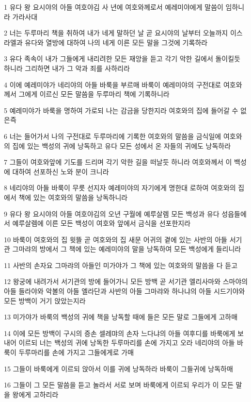 \par 1 유다 왕 요시야의 아들 여호야김 사 년에 여호와께로서 예레미야에게 말씀이 임하니라 가라사대
\par 2 너는 두루마리 책을 취하여 내가 네게 말하던 날 곧 요시야의 날부터 오늘까지 이스라엘과 유다와 열방에 대하여 나의 네게 이른 모든 말을 그것에 기록하라
\par 3 유다 족속이 내가 그들에게 내리려한 모든 재앙을 듣고 각기 악한 길에서 돌이킬듯 하니라 그리하면 내가 그 악과 죄를 사하리라
\par 4 이에 예레미야가 네리야의 아들 바룩을 부르매 바룩이 예레미야의 구전대로 여호와께서 그에게 이르신 모든 말씀을 두루마리 책에 기록하니라
\par 5 예레미야가 바룩을 명하여 가로되 나는 감금을 당한지라 여호와의 집에 들어갈 수 없은즉
\par 6 너는 들어가서 나의 구전대로 두루마리에 기록한 여호와의 말씀을 금식일에 여호와의 집에 있는 백성의 귀에 낭독하고 유다 모든 성에서 온 자들의 귀에도 낭독하라
\par 7 그들이 여호와앞에 기도를 드리며 각기 악한 길을 떠날듯 하니라 여호와께서 이 백성에 대하여 선포하신 노와 분이 크니라
\par 8 네리야의 아들 바룩이 무릇 선지자 예레미야의 자기에게 명한대 로하여 여호와의 집에서 책에 있는 여호와의 말씀을 낭독하니라
\par 9 유다 왕 요시야의 아들 여호야김의 오년 구월에 예루살렘 모든 백성과 유다 성읍들에서 예루살렘에 이른 모든 백성이 여호와 앞에서 금식을 선포한지라
\par 10 바룩이 여호와의 집 윗뜰 곧 여호와의 집 새문 어귀의 곁에 있는 사반의 아들 서기관 그마랴의 방에서 그 책에 있는 예레미야의 말을 낭독하여 모든 백성에게 들리니라
\par 11 사반의 손자요 그마랴의 아들인 미가야가 그 책에 있는 여호와의 말씀을 다 듣고
\par 12 왕궁에 내려가서 서기관의 방에 들어가니 모든 방백 곧 서기관 엘리사마와 스마야의 아들 들라야와 악볼의 아들 엘라단과 사반의 아들 그마랴와 하나냐의 아들 시드기야와 모든 방백이 거기 앉았는지라
\par 13 미가야가 바룩의 백성의 귀에 책을 낭독할 때에 들은 모든 말로 그들에게 고하매
\par 14 이에 모든 방백이 구시의 증손 셀레먀의 손자 느다냐의 아들 여후디를 바룩에게 보내어 이르되 너는 백성의 귀에 낭독한 두루마리를 손에 가지고 오라 네리야의 아들 바룩이 두루마리를 손에 가지고 그들에게로 가매
\par 15 그들이 바룩에게 이르되 앉아서 이를 귀에 낭독하라 바룩이 그들귀에 낭독하매
\par 16 그들이 그 모든 말씀을 듣고 놀라서 서로 보며 바룩에게 이르되 우리가 이 모든 말을 왕에게 고하리라
